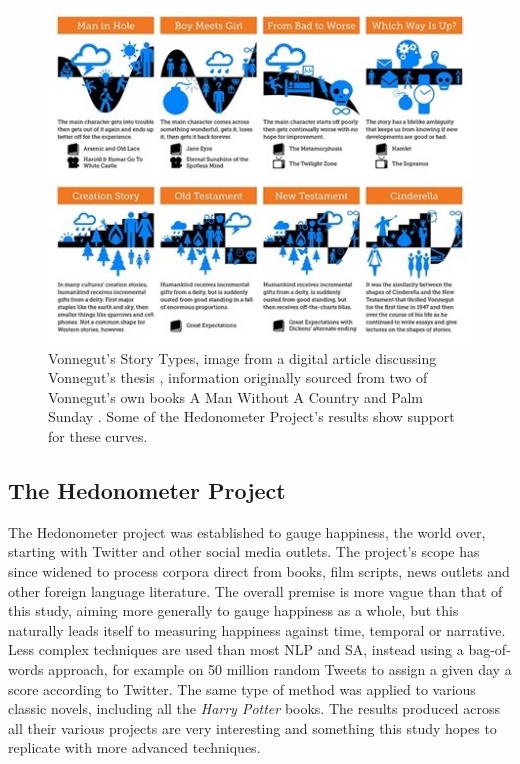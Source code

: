 \documentclass{article}
\begin{document}
        \begin{figure}[htbp]
            \centering
            \includegraphics{Figures/Misc/VonnegutShapes}
            \caption{Vonnegut's Story Types, image from a digital article discussing Vonnegut's thesis \citep{vonnegutThesis}, information originally sourced from two of Vonnegut's own books \textup{A Man Without A Country} \citep{vonnegut_simon_2007} and \textup{Palm Sunday} \citep{vonnegut_1981}. Some of the Hedonometer Project's results show support for these curves.}
            \label{fig:storyTypes}
        \end{figure}
        
    \subsection{The Hedonometer Project}
    \label{subsec:hedonometer}
        The Hedonometer project was established to gauge happiness, the world over, starting with Twitter and other social media outlets. The project’s scope has since widened to process corpora direct from books, film scripts, news outlets and other foreign language literature. The overall premise is more vague than that of this study, aiming more generally to gauge happiness as a whole, but this naturally leads itself to measuring happiness against time, temporal or narrative. 
        Less complex techniques are used than most NLP and SA, instead using a bag-of-words approach, for example on 50 million random Tweets to assign a given day a score according to Twitter. The same type of method was applied to various classic novels, including all the \textit{Harry Potter} books. The results produced across all their various projects are very interesting and something this study hopes to replicate with more advanced techniques.
\newpage
\end{document}
